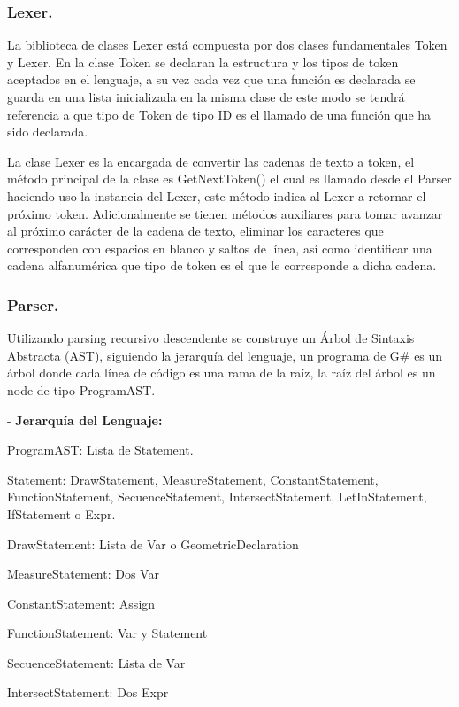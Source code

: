 \documentclass[a4paper,12pt]{article}
\begin{document}
	\subsubsection{Lexer.}\label{subsub:lexer}
	La biblioteca de clases Lexer está compuesta por dos clases fundamentales Token y Lexer. En la clase Token se declaran la estructura y los tipos de token aceptados en el lenguaje, a su vez cada vez que una función es declarada se guarda en una lista inicializada en la misma clase de este modo se tendrá referencia a que tipo de Token de tipo ID es el llamado de una función que ha sido declarada.
	
	La clase Lexer es la encargada de convertir las cadenas de texto a token, el método principal de la clase es GetNextToken() el cual es llamado desde el Parser haciendo uso la instancia del Lexer, este método indica al Lexer a retornar el próximo token. Adicionalmente se tienen métodos auxiliares para tomar avanzar al próximo carácter de la cadena de texto, eliminar los caracteres que corresponden con espacios en blanco y saltos de línea, así como identificar una cadena alfanumérica que tipo de token es el que le corresponde a dicha cadena.
	
	
	\subsubsection{Parser.}\label{subsub:parser}
	Utilizando parsing recursivo descendente se construye un Árbol de Sintaxis Abstracta (AST), siguiendo la jerarquía del lenguaje, un programa de G\# es un árbol donde cada línea de código es una rama de la raíz, la raíz del árbol es un node de tipo ProgramAST.
	
	\vspace{0.5cm}
	- \textbf{Jerarquía del Lenguaje:}
	
	ProgramAST: Lista de Statement.
	
	Statement: DrawStatement, MeasureStatement, ConstantStatement, FunctionStatement, SecuenceStatement, IntersectStatement, LetInStatement, IfStatement o Expr.
	
	DrawStatement: Lista de Var o GeometricDeclaration
	
	MeasureStatement: Dos Var
	
	ConstantStatement: Assign
	
	FunctionStatement: Var y Statement
	
	SecuenceStatement: Lista de Var
	
	IntersectStatement: Dos Expr
	
\end{document}
